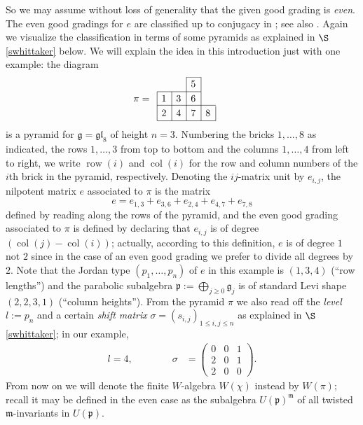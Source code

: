 \documentclass[twoside,12pt,reqno]{amsart}
\def\row{\operatorname{row}}
\def\col{\operatorname{col}}
\begin{document}
So we may
assume without loss of generality
that the given good grading is {\em even}.
The even good gradings for $e$ are classified up to conjugacy
in \cite[Proposition 4.3]{EK}; see also \cite[Lemma 7.2]{Ly}.
Again we visualize the classification in terms of some
pyramids as explained in $\S$\ref{swhittaker} below.
We will explain the idea in this introduction just
with one example: the diagram
\vspace{-1mm}
$$
\begin{picture}(50, 45)%
\put(0,0){\line(1,0){60}}
\put(0,16){\line(1,0){60}}
\put(0,30){\line(1,0){45}}
\put(30,45){\line(1,0){15}}
\put(0,0){\line(0,1){30}}
\put(15,0){\line(0,1){30}}
\put(30,0){\line(0,1){45}}
\put(45,0){\line(0,1){45}}
\put(60,0){\line(0,1){15}}
\put(7,23){\makebox(0,0){1}}
\put(7,8){\makebox(0,0){2}}
\put(22,8){\makebox(0,0){4}}
\put(22,23){\makebox(0,0){3}}
\put(37,8){\makebox(0,0){7}}
\put(37,23){\makebox(0,0){6}}
\put(52,8){\makebox(0,0){8}}
\put(37,38){\makebox(0,0){5}}
\put(-16,22){\makebox(0,0){$\pi=$}}
\end{picture}
$$
is a pyramid for $\mathfrak{g} = \mathfrak{gl}_8$ of height $n=3$.
Numbering the bricks $1,\dots,8$
as indicated, the rows $1,\dots,3$ from top to bottom and the columns
$1,\dots,4$ from left to right,
we write $\row(i)$ and $\col(i)$ for the row 
and column numbers of the $i$th brick in the pyramid, respectively.
Denoting the $ij$-matrix unit by $e_{i,j}$, the
nilpotent matrix $e$ associated to $\pi$ is the matrix
$$
e = e_{1,3} + e_{3,6} + e_{2,4}+e_{4,7}+e_{7,8}
$$
defined by reading along the rows of the pyramid,
and the even good grading associated
to $\pi$ is defined by declaring that $e_{i,j}$ is of degree
$(\col(j)-\col(i))$;
actually, according to this definition, $e$ is of degree $1$ not $2$ since 
in the case of an even good grading
we prefer to divide all degrees by $2$.
Note that the Jordan type $(p_1,\dots,p_n)$ of 
$e$ in this example is $(1,3,4)$ (``row lengths'') and 
the parabolic subalgebra $\mathfrak{p} := \bigoplus_{j \geq 0}
\mathfrak{g}_j$ is of standard Levi shape $(2,2,3,1)$ (``column heights''). 
From the pyramid $\pi$ we also read off the
{\em level} $l := p_n$ and 
a certain {\em shift matrix}
$\sigma = (s_{i,j})_{1 \leq i,j \leq n}$
as explained in $\S$\ref{swhittaker}; in our example,
\begin{align*}
l=4,\qquad\qquad
\sigma &= \left(
\begin{array}{lll}
0&0&1\\
2&0&1\\
2&0&0
\end{array}
\right).
\end{align*}
{From now on} we will denote the finite $W$-algebra
$W(\chi)$ instead by $W(\pi)$;
recall it may be defined in the even case as the 
subalgebra $U(\mathfrak{p})^{\mathfrak{m}}$ of 
all twisted $\mathfrak{m}$-invariants in $U(\mathfrak{p})$.
\end{document}
